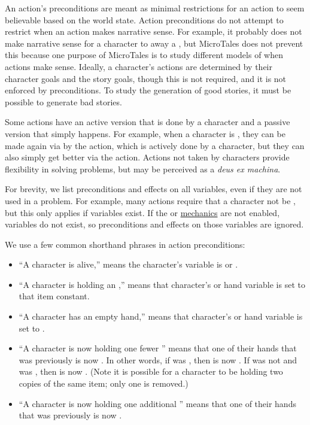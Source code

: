 \documentclass{nilreport}
\begin{document}
An action's preconditions are meant as minimal restrictions for an action to seem believable based on the world state. Action preconditions do not attempt to restrict when an action makes narrative sense. For example, it probably does not make narrative sense for a  character to  away a , but MicroTales does not prevent this because one purpose of MicroTales is to study different models of when actions make sense. Ideally, a character's actions are determined by their character goals and the story goals, though this is not required, and it is not enforced by preconditions. To study the generation of good stories, it must be possible to generate bad stories.

Some actions have an active version that is done by a character and a passive version that simply happens. For example, when a character is , they can be made  again via by the  action, which is actively done by a character, but they can also simply get better via the  action. Actions not taken by characters provide flexibility in solving problems, but may be perceived as a {\em deus ex machina}. 

For brevity, we list preconditions and effects on all variables, even if they are not used in a problem. For example, many actions require that a character not be , but this only applies if  variables exist. If the  or  \hyperref[sec:mechanics]{mechanics} are not enabled,  variables do not exist, so preconditions and effects on those variables are ignored.

We use a few common shorthand phrases in action preconditions:
\begin{itemize}
	\item ``A character is alive,'' means the character's  variable is  or .
	\item ``A character is holding an ,'' means that character's  or  hand variable is set to that item constant.
	\item ``A character has an empty hand,'' means that character's  or  hand variable is set to \None.
	\item ``A character is now holding one fewer '' means that one of their hands that was previously  is now \None. In other words, if  was , then  is now \None. If  was not  and  was , then  is now \None. (Note it is possible for a character to be holding two copies of the same item; only one is removed.)
	\item ``A character is now holding one additional '' means that one of their hands that was previously \None is now .
\end{itemize}
\end{document}
